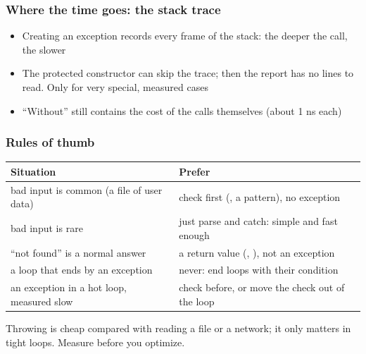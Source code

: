 \documentclass[aspectratio=169,10pt,compress]{beamer}
\begin{document}
\begin{frame}[t,fragile] \frametitle{Where the time goes: the stack trace}

	\begin{itemize}\footnotesize
		\item<2-> Creating an exception records every frame of the stack: the deeper the call, the slower
		\item<2-> The protected constructor  can skip the trace; then the
			  report has no lines to read. Only for very special, measured cases
		\item<2-> ``Without'' still contains the cost of the calls themselves (about 1 ns each)
	\end{itemize}
\end{frame}




\begin{frame}[t,fragile] \frametitle{Rules of thumb}


\begin{table}
		\footnotesize
		\begin{tabular}{@{}L{0.40\textwidth}L{0.52\textwidth}@{}}
			\toprule
			\textbf{Situation} & \textbf{Prefer} \\
			\midrule
			bad input is common (a file of user data)    & check first (, a pattern), no exception \\
			bad input is rare                            & just parse and catch: simple and fast enough \\
			``not found'' is a normal answer             & a return value (, ), not an exception \\
			a loop that ends by an exception             & never: end loops with their condition \\
			an exception in a hot loop, measured slow    & check before, or move the check out of the loop \\
			\bottomrule
		\end{tabular}
\end{table}%


	\vspace{0.3em}
	\small Throwing is cheap compared with reading a file or a network; it only matters in tight loops.
	Measure before you optimize.
\end{frame}
\end{document}
